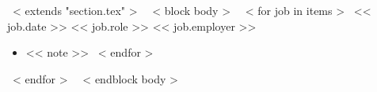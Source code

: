 ~< extends "section.tex" >~
~< block body >~
  ~< for job in items >~
    \cventry
      {<< job.date >>}
      {<< job.role >>}
      {<< job.employer >>}{}{}{}
    \begin{itemize}
      ~< for note in job.notes >~
        \item{<< note >>}
      ~< endfor >~
    \end{itemize}
  ~< endfor >~
~< endblock body >~
